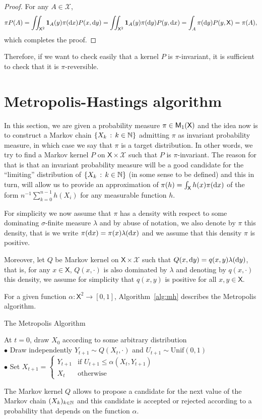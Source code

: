 \documentclass[english,graybox,envcountchap,envcountsame,sectrefs,shortlabels]{svmono}
\theoremstyle{style}
\newcommand{\Xset}{\mathsf{X}}
\newcommand{\Xsigma}{\mathcal{X}}
\begin{document}
\begin{proof}
For any $A\in\Xsigma$, 
\[
\pi P(A)=\iint_{\Xset^{2}}\indi A(y)\pi(\rmd x)P(x,\rmd y)=\iint_{\Xset^{2}}\indi A(y)\pi(\rmd y)P(y,\rmd x)=\int_{A}\pi(\rmd y)P(y,\Xset)=\pi(A),
\]
which completes the proof.
\end{proof}
Therefore, if we want to check easily that
a kernel $P$ is $\pi$-invariant, it is sufficient to check that
it is $\pi$-reversible.


\section{Metropolis-Hastings algorithm}
In this section, we are given a probability measure $\pi\in\meas 1(\Xset)$
and the idea now is to construct a Markov chain $\left\{ X_{k}\,:\,k\in\mathbb{N}\right\}$
admitting $\pi$ as invariant probability measure, in which case we
say that $\pi$ is a target distribution. In other words, we try to
find a Markov kernel $P$ on $\Xset\times\Xsigma$ such that $P$
is $\pi$-invariant. The reason for that is that an invariant probability
measure will be a good candidate for the ``limiting'' distribution
of $\left\{ X_{k}\,:\,k\in\mathbb{N}\right\}$ (in some sense to be defined) and this
in turn, will allow us to provide an approximation of $\pi(h)=\int_{\Xset}h(x)\pi(\rmd x)$ of the form $n^{-1}\sum_{k=0}^{n-1}h(X_{i})$ for any measurable function $h$. 


For simplicity we now assume that $\pi$ has a density with respect
to some dominating $\sigma$-finite measure $\lambda$ and by abuse
of notation, we also denote by $\pi$ this density, that is we write
$\pi(\mathrm{d} x)=\pi(x)\lambda(\mathrm{d} x)$ and we assume that this density
$\pi$ is positive.

Moreover, let $Q$ be Markov kernel on $\Xset\times\Xsigma$ such
that $Q(x,\mathrm{d} y)=q(x,y)\lambda(\mathrm{d} y)$, that is, for any $x\in\Xset$,
$Q(x,\cdot)$ is also dominated by $\lambda$ and denoting by $q(x,\cdot)$
this density, we assume for simplicity that $q(x,y)$ is positive
for all $x,y\in\Xset$. 

For a given function $\alpha:\Xset^{2}\to[0,1]$,  Algorithm~\ref{alg:mh} describes the Metropolis algorithm.

\begin{algorithm}
\caption{\label{alg:mh}The Metropolis Algorithm}
{}
\BlankLine
At $t=0$, draw $X_{0}$ according to some arbitrary distribution\\
{
$\bullet$ Draw independently $Y_{t+1}\sim Q(X_{t},\cdot)$ and $U_{t+1}\sim\mathrm{Unif}(0,1)$\\
$\bullet$ Set $X_{t+1}=\begin{cases} Y_{t+1} & \mbox{if }U_{t+1}\leq\alpha(X_{t},Y_{t+1})\\ X_{t} & \mbox{otherwise} \end{cases}$
}
\end{algorithm}
The Markov kernel $Q$ allows to propose a candidate for the next value of
the Markov chain $(X_{k})_{k\in\mathbb{N}}$ and this candidate is accepted or
rejected according to a probability that depends on the function $\alpha$.
\end{document}
